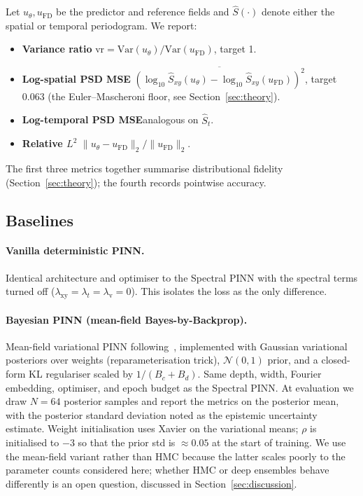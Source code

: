 \documentclass[review,12pt]{elsarticle}
\begin{document}
Let \(u_\theta, u_{\mathrm{FD}}\) be the predictor and reference
fields and \(\widehat S(\cdot)\) denote either the spatial or
temporal periodogram. We report:
\begin{itemize}
\item \textbf{Variance ratio}\quad
\(\mathrm{vr} = \mathrm{Var}(u_\theta)/\mathrm{Var}(u_{\mathrm{FD}})\),
target 1.
\item \textbf{Log-spatial PSD MSE}\quad
\(\overline{(\log_{10}\widehat S_{xy}(u_\theta) -
\log_{10}\widehat S_{xy}(u_{\mathrm{FD}}))^2}\), target 0.063
(the Euler--Mascheroni floor, see Section~\ref{sec:theory}).
\item \textbf{Log-temporal PSD MSE}\quad analogous on
\(\widehat S_t\).
\item \textbf{Relative \(L^2\)}\quad
\(\|u_\theta - u_{\mathrm{FD}}\|_2 / \|u_{\mathrm{FD}}\|_2\).
\end{itemize}
The first three metrics together summarise distributional
fidelity (Section~\ref{sec:theory}); the fourth records pointwise
accuracy.

\subsection{Baselines}

\paragraph{Vanilla deterministic PINN.} Identical architecture and
optimiser to the Spectral PINN with the spectral terms turned off
(\(\lambda_{\mathrm{xy}} = \lambda_t = \lambda_{\mathrm v} = 0\)).
This isolates the loss as the only difference.

\paragraph{Bayesian PINN (mean-field Bayes-by-Backprop).}
Mean-field variational PINN following~\cite{YangMengKarniadakis2021},
implemented with Gaussian variational posteriors over weights
(reparameterisation trick), \(\mathcal N(0, 1)\) prior, and a
closed-form KL regulariser scaled by \(1/(B_c + B_d)\). Same
depth, width, Fourier embedding, optimiser, and epoch budget as
the Spectral PINN. At evaluation we draw \(N = 64\) posterior
samples and report the metrics on the posterior mean, with the
posterior standard deviation noted as the epistemic uncertainty
estimate. Weight initialisation uses Xavier on the variational
means; \(\rho\) is initialised to \(-3\) so that the prior std is
\(\approx 0.05\) at the start of training. We use the mean-field
variant rather than HMC because the latter scales poorly to the
parameter counts considered here; whether HMC or deep ensembles
behave differently is an open question, discussed in
Section~\ref{sec:discussion}.
\end{document}
